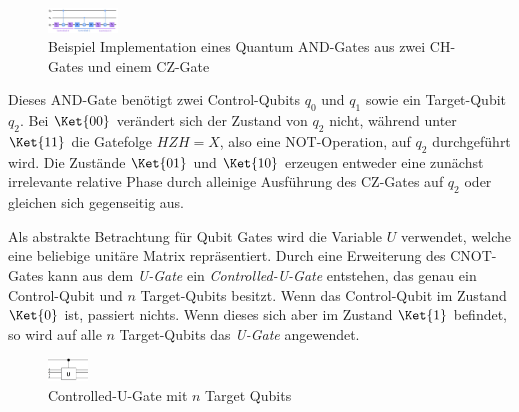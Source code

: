 \begin{figure}
    \includegraphics[width=70]{content/and-example-long.JPG}
    \caption{Beispiel Implementation eines Quantum AND-Gates aus zwei CH-Gates und einem CZ-Gate}

\end{figure}\newline


Dieses AND-Gate benötigt zwei Control-Qubits \(q_0\) und \(q_1\) sowie ein Target-Qubit \(q_2\). Bei \(\Ket{00}\) verändert sich der Zustand von \(q_2\) nicht, während unter \(\Ket{11}\) die Gatefolge \(HZH=X\), also eine NOT-Operation, auf \(q_2\) durchgeführt wird. Die Zustände \(\Ket{01}\) und \(\Ket{10}\) erzeugen entweder eine zunächst irrelevante relative Phase durch alleinige Ausführung des CZ-Gates auf \(q_2\) oder gleichen sich gegenseitig aus. \newline

Als abstrakte Betrachtung für Qubit Gates wird die Variable \(U\) verwendet, welche eine beliebige unitäre Matrix repräsentiert. Durch eine Erweiterung des CNOT-Gates kann aus dem \textit{U-Gate} ein \textit{Controlled-U-Gate} entstehen, das genau ein Control-Qubit und \(n\) Target-Qubits besitzt. Wenn das Control-Qubit im Zustand \(\Ket{0}\) ist, passiert nichts. Wenn dieses sich aber im Zustand \(\Ket{1}\) befindet, so wird auf alle \(n\) Target-Qubits das \textit{U-Gate} angewendet.

\begin{figure}
    \includegraphics[width=40]{content/uGate.png}
    \caption{Controlled-U-Gate mit \(n\) Target Qubits}
\end{figure}

